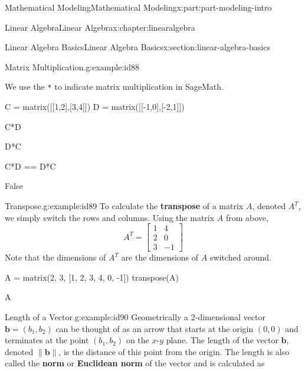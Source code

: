 \documentclass[oneside,10pt,]{book}
\newcommand{\mono}[1]{\texttt{#1}}
\newcommand{\terminology}[1]{\textbf{#1}}
\numberwithin{equation}{section}
\begin{document}
\begin{partptx}{Mathematical Modeling}{}{Mathematical Modeling}{}{}{x:part:part-modeling-intro}
\begin{chapterptx}{Linear Algebra}{}{Linear Algebra}{}{}{x:chapter:linearalgebra}
\begin{sectionptx}{Linear Algebra Basics}{}{Linear Algebra Basics}{}{}{x:section:linear-algebra-basics}
\begin{example}{Matrix Multiplication.}{g:example:id88}
\par
We use the \mono{*} to indicate matrix multiplication in SageMath.%
\begin{sageinput}
C = matrix([[1,2],[3,4]])
D = matrix([[-1,0],[-2,1]])
\end{sageinput}
\begin{sageinput}
C*D
\end{sageinput}
\begin{sageoutput}
[ -5   2]
[-11   4]
\end{sageoutput}
\begin{sageinput}
D*C
\end{sageinput}
\begin{sageoutput}
[-1 -2]
[ 1  0]
\end{sageoutput}
\begin{sageinput}
C*D == D*C
\end{sageinput}
\begin{sageoutput}
False
\end{sageoutput}
\end{example}
\begin{example}{Transpose.}{g:example:id89}%
To calculate the \terminology{transpose} of a matrix \(A\), denoted \(A^T\), we simply switch the rows and columns. Using the matrix \(A\) from above,%
%
\begin{equation*}
A^T = \begin{bmatrix}
1 & 4 \\
2 & 0 \\
3 & -1
\end{bmatrix} 
\end{equation*}
Note that the dimensions of \(A^T\) are the dimensions of \(A\) switched around.%
\begin{sageinput}
A = matrix(2, 3, [1, 2, 3, 4, 0, -1])
transpose(A)
\end{sageinput}
\begin{sageoutput}
[ 1  4]
[ 2  0]
[ 3 -1]
\end{sageoutput}
\begin{sageinput}
A
\end{sageinput}
\begin{sageoutput}
[ 1  2  3]
[ 4  0 -1]
\end{sageoutput}
\end{example}
\begin{example}{Length of a Vector.}{g:example:id90}%
Geometrically a 2-dimensional vector \(\mathbf{b} = (b_1, b_2)\) can be thought of as an arrow that starts at the origin \((0, 0)\) and terminates at the point \((b_1, b_2)\) on the \(x\)-\(y\) plane. The length of the vector \(\mathbf{b}\), denoted \(\|\mathbf{b}\|\), is the distance of this point from the origin. The length is also called the \terminology{norm} or \terminology{Euclidean norm} of the vector and is calculated as%

\end{example}
\end{sectionptx}
\end{chapterptx}
\end{partptx}
\end{document}
